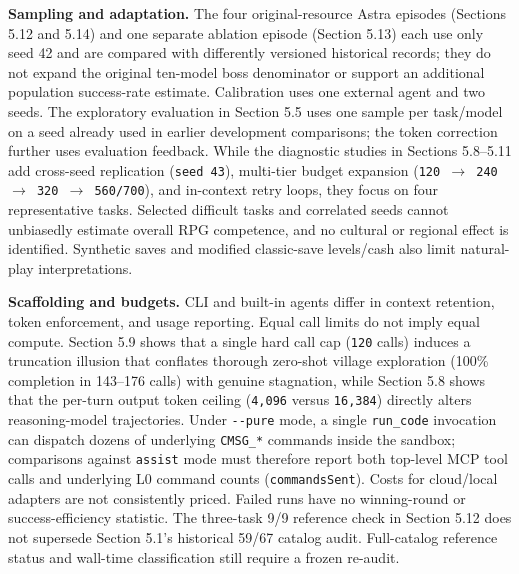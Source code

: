 \documentclass[11pt,a4paper]{article}
\begin{document}
\textbf{Sampling and adaptation.} The four original-resource Astra episodes (Sections 5.12 and 5.14) and one separate ablation episode (Section 5.13) each use only seed 42 and are compared with differently versioned historical records; they do not expand the original ten-model boss denominator or support an additional population success-rate estimate. Calibration uses one external agent and two seeds. The exploratory evaluation in Section 5.5 uses one sample per task/model on a seed already used in earlier development comparisons; the token correction further uses evaluation feedback. While the diagnostic studies in Sections 5.8--5.11 add cross-seed replication (\texttt{seed\allowbreak{} \allowbreak{}43}), multi-tier budget expansion (\texttt{120\allowbreak{} \allowbreak{}\ensuremath{\rightarrow}\allowbreak{} \allowbreak{}240\allowbreak{} \allowbreak{}\ensuremath{\rightarrow}\allowbreak{} \allowbreak{}320\allowbreak{} \allowbreak{}\ensuremath{\rightarrow}\allowbreak{} \allowbreak{}560\allowbreak{}/\allowbreak{}700}), and in-context retry loops, they focus on four representative tasks. Selected difficult tasks and correlated seeds cannot unbiasedly estimate overall RPG competence, and no cultural or regional effect is identified. Synthetic saves and modified classic-save levels/cash also limit natural-play interpretations.

\textbf{Scaffolding and budgets.} CLI and built-in agents differ in context retention, token enforcement, and usage reporting. Equal call limits do not imply equal compute. Section 5.9 shows that a single hard call cap (\texttt{120} calls) induces a truncation illusion that conflates thorough zero-shot village exploration (100\% completion in 143--176 calls) with genuine stagnation, while Section 5.8 shows that the per-turn output token ceiling (\texttt{4\allowbreak{},\allowbreak{}096} versus \texttt{16\allowbreak{},\allowbreak{}384}) directly alters reasoning-model trajectories. Under \texttt{-\allowbreak{}-\allowbreak{}pure} mode, a single \texttt{run\allowbreak{}\_\allowbreak{}code} invocation can dispatch dozens of underlying \texttt{CMSG\allowbreak{}\_\allowbreak{}*} commands inside the sandbox; comparisons against \texttt{assist} mode must therefore report both top-level MCP tool calls and underlying L0 command counts (\texttt{commands\allowbreak{}Sent}). Costs for cloud/local adapters are not consistently priced. Failed runs have no winning-round or success-efficiency statistic. The three-task 9/9 reference check in Section 5.12 does not supersede Section 5.1's historical 59/67 catalog audit. Full-catalog reference status and wall-time classification still require a frozen re-audit.
\end{document}

